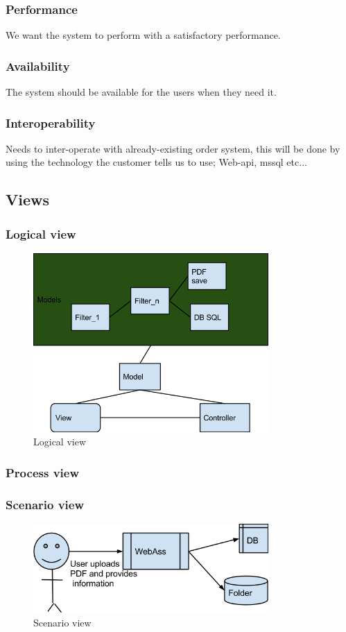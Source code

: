 \subsubsection{Performance}
We want the system to perform with a satisfactory performance.
\subsubsection{Availability}
The system should be available for the users when they need it.
\subsubsection{Interoperability}
Needs to inter-operate with already-existing order system, this will be done by using the technology the customer tells us to use; Web-api, mssql etc...

\subsection{Views}

\subsubsection{Logical view}
\begin{figure}[h]
\centering
\includegraphics[width=0.8\textwidth]{images/architecture00.png}
\caption{Logical view}
\label{fig:logical_view}
\end{figure}
\subsubsection{Process view}
\newpage
\subsubsection{Scenario view}
\begin{figure}[h]
\centering
\includegraphics[width=0.8\textwidth]{images/architecture01.png}
\caption{Scenario view}
\label{fig:scenario_view}
\end{figure}


